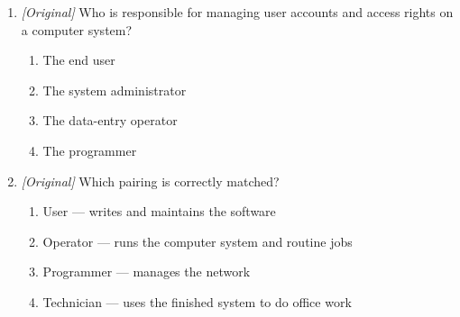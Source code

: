 \begin{enumerate}[label=\textbf{Q\arabic*.}, leftmargin=*]
  \textbf{digital public service}?
  \begin{enumerate}[label=\Alph*.]
    \item Applying for a certificate through an online government portal
    \item Buying goods from a private online shop
    \item Sending a personal email to a friend
    \item Using a word processor to type a letter
  \end{enumerate}
\item \textit{[Original]} Who is responsible for managing user accounts and
  access rights on a computer system?
  \begin{enumerate}[label=\Alph*.]
    \item The end user
    \item The system administrator
    \item The data-entry operator
    \item The programmer
  \end{enumerate}
\item \textit{[Original]} Which pairing is correctly matched?
  \begin{enumerate}[label=\Alph*.]
    \item User --- writes and maintains the software
    \item Operator --- runs the computer system and routine jobs
    \item Programmer --- manages the network
    \item Technician --- uses the finished system to do office work
  \end{enumerate}


\end{enumerate}

